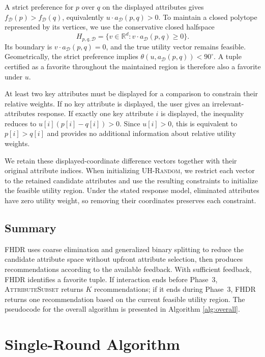 \documentclass[conference]{IEEEtran}
\theoremstyle{definition}
\theoremstyle{plain}
\begin{document}
A strict preference for $p$ over $q$ on the displayed attributes gives $f_{\mathcal{D}}(p)>f_{\mathcal{D}}(q)$, equivalently $u\cdot a_{\mathcal{D}}(p,q)>0$. To maintain a closed polytope represented by its vertices, we use the conservative closed halfspace
\[
H_{p,q,\mathcal{D}}=\{v\in\mathbb{R}^d:v\cdot a_{\mathcal{D}}(p,q)\geq0\}.
\]
Its boundary is $v\cdot a_{\mathcal{D}}(p,q)=0$, and the true utility vector remains feasible. Geometrically, the strict preference implies $\theta(u,a_{\mathcal{D}}(p,q))<90^\circ$. A tuple certified as a favorite throughout the maintained region is therefore also a favorite under $u$.

At least two key attributes must be displayed for a comparison to constrain their relative weights. If no key attribute is displayed, the user gives an irrelevant-attributes response. If exactly one key attribute $i$ is displayed, the inequality reduces to $u[i](p[i]-q[i])>0$. Since $u[i]>0$, this is equivalent to $p[i]>q[i]$ and provides no additional information about relative utility weights.

We retain these displayed-coordinate difference vectors together with their original attribute indices. When initializing \textsc{UH-Random}, we restrict each vector to the retained candidate attributes and use the resulting constraints to initialize the feasible utility region. Under the stated response model, eliminated attributes have zero utility weight, so removing their coordinates preserves each constraint.

\subsection{Summary}
\label{subsec:sum}

FHDR uses coarse elimination and generalized binary splitting to reduce the candidate attribute space without upfront attribute selection, then produces recommendations according to the available feedback. With sufficient feedback, FHDR identifies a favorite tuple. If interaction ends before Phase~3, \textsc{AttributeSubset} returns $K$ recommendations; if it ends during Phase~3, FHDR returns one recommendation based on the current feasible utility region. The pseudocode for the overall algorithm is presented in Algorithm \ref{alg:overall}.

\FloatBarrier



\section{Single-Round Algorithm}
\label{sec:attsub}
\end{document}
